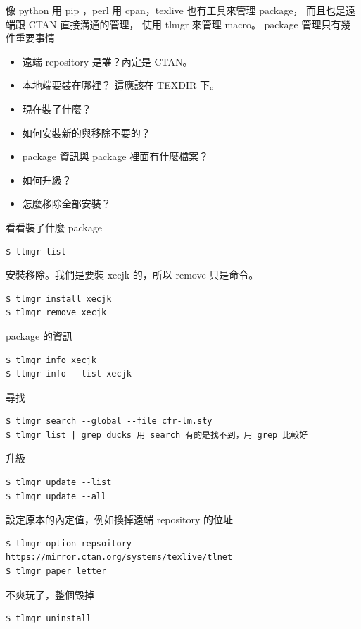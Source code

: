 像 python 用 pip ，perl 用 cpan，texlive 也有工具來管理 package，
而且也是遠端跟 CTAN 直接溝通的管理， 使用 tlmgr 來管理 macro。
package 管理只有幾件重要事情
\begin{itemize}
\item 遠端 repository 是誰？內定是 CTAN。
\item 本地端要裝在哪裡？ 這應該在 TEXDIR 下。
\item 現在裝了什麼？
\item 如何安裝新的與移除不要的？
\item package 資訊與 package 裡面有什麼檔案？
\item 如何升級？
\item 怎麼移除全部安裝？
\end{itemize}
看看裝了什麼 package
\begin{verbatim}
$ tlmgr list
\end{verbatim}
安裝移除。我們是要裝 xecjk 的，所以 remove 只是命令。
\begin{verbatim}
$ tlmgr install xecjk
$ tlmgr remove xecjk
\end{verbatim}
package 的資訊
\begin{verbatim}
$ tlmgr info xecjk
$ tlmgr info --list xecjk
\end{verbatim}
尋找
\begin{verbatim}
$ tlmgr search --global --file cfr-lm.sty
$ tlmgr list | grep ducks 用 search 有的是找不到，用 grep 比較好
\end{verbatim}
升級
\begin{verbatim}
$ tlmgr update --list
$ tlmgr update --all
\end{verbatim}
設定原本的內定值，例如換掉遠端 repository 的位址
\begin{verbatim}
$ tlmgr option repsoitory https://mirror.ctan.org/systems/texlive/tlnet
$ tlmgr paper letter
\end{verbatim}
不爽玩了，整個毀掉
\begin{verbatim}
$ tlmgr uninstall
\end{verbatim}


